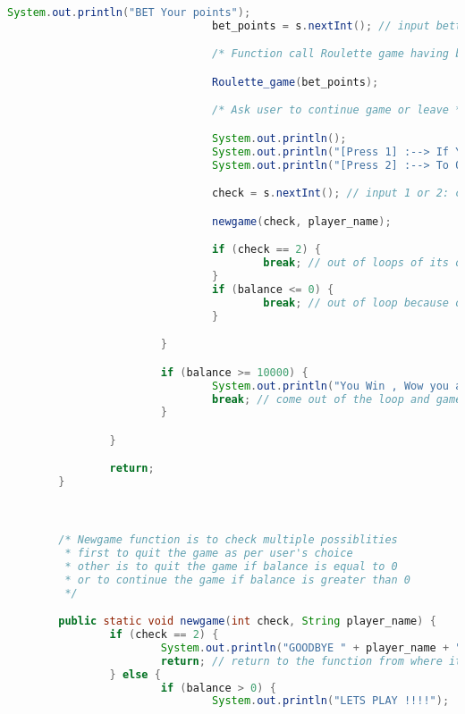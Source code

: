 \documentclass[]{article}
\begin{document}
\begin{lstlisting}[language=Java]
                                System.out.println("BET Your points");
                                bet_points = s.nextInt(); // input betted points

                                /* Function call Roulette game having bet points as parameters */

                                Roulette_game(bet_points);

                                /* Ask user to continue game or leave */

                                System.out.println();
                                System.out.println("[Press 1] :--> If You Like To Try Another game");
                                System.out.println("[Press 2] :--> To QUIT");

                                check = s.nextInt(); // input 1 or 2: continue or leave

                                newgame(check, player_name);

                                if (check == 2) {
                                        break; // out of loops of its own choice
                                }
                                if (balance <= 0) {
                                        break; // out of loop because of 0 balance
                                }

                        }

                        if (balance >= 10000) {
                                System.out.println("You Win , Wow you are so lucky");
                                break; // come out of the loop and game gets over.
                        }

                }

                return;
        }



        /* Newgame function is to check multiple possiblities
         * first to quit the game as per user's choice
         * other is to quit the game if balance is equal to 0 
         * or to continue the game if balance is greater than 0
         */

        public static void newgame(int check, String player_name) {
                if (check == 2) {
                        System.out.println("GOODBYE " + player_name + " !!!");
                        return; // return to the function from where it is being called
                } else {
                        if (balance > 0) {
                                System.out.println("LETS PLAY !!!!");


\end{lstlisting}
\end{document}
